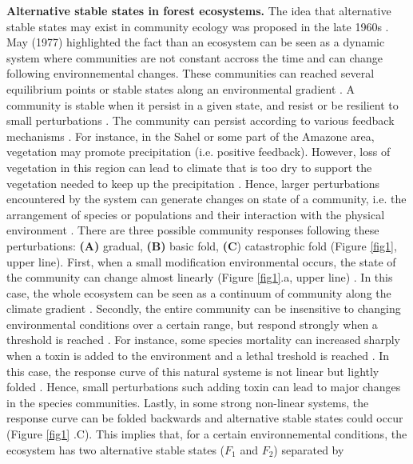 \textbf{Alternative stable states in forest ecosystems.} The idea that
alternative stable states may exist in community ecology was proposed in the
late 1960s \cite{Scheffer2001,Society2014a}.  May (1977) \cite{May1977}
highlighted the fact than an ecosystem can be seen as a dynamic system where
communities are not constant accross the time and can change following
environnemental changes. These communities can reached several equilibrium
points or stable states along an environmental gradient \cite{May1977}.   A
community is  stable when it persist in a given state, and resist or be
resilient to small perturbations \cite{Filbee-Dexter2013}.    The community
can persist according to various feedback mechanisms \cite{Filbee-Dexter2013}.
For instance, in the Sahel or some part of the Amazone area, vegetation may
promote precipitation (i.e. positive feedback). However, loss of vegetation in
this region can lead to climate that is too dry to support the vegetation
needed to keep up the precipitation \cite{scheffer2009critical}. Hence, larger
perturbations encountered by the system can generate changes on state of a
community, i.e. the arrangement of species or populations and their
interaction with the physical environment \cite {Filbee-Dexter2013}. There are
three possible community responses following these perturbations: \textbf{(A)}
gradual, \textbf{(B)} basic fold, \textbf{(C}) catastrophic fold
\cite{Scheffer2001} (Figure \ref{fig1}, upper line). First, when a small
modification environmental occurs, the state of the community can change
almost linearly (Figure \ref{fig1}.a, upper line)
\cite{Scheffer2001,Scheffer2009}. In this case, the whole ecosystem can be
seen as a continuum of community along the climate gradient
\cite{Scheffer2001,Scheffer2009,scheffer2009critical}. Secondly, the entire
community can be insensitive to changing environmental conditions over a
certain range, but respond strongly when a threshold is reached
\cite{scheffer2009critical}. For instance, some species mortality can
increased sharply when a toxin is added to the environment and a lethal
treshold is reached \cite{scheffer2009critical}. In this case, the response
curve of this natural systeme is not linear but lightly folded . Hence,  small
perturbations such adding toxin can lead to major changes in the species
communities. Lastly, in some strong non-linear systems, the response curve can
be folded backwards and alternative stable states could occur (Figure
\ref{fig1} .C).  This implies that, for a certain environnemental conditions,
the ecosystem has two alternative stable states ($F_1$ and $F_2$) separated by
